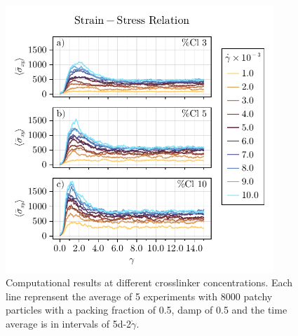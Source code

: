 \begin{figure}[ht!]
    \centering
    \includegraphics[width=0.9\textwidth]{figs/ComputaitonalResults/stress-strain.pdf}
    \caption{Computational results at different crosslinker concentrations. Each line reprensent the average of 5 experiments with \num{8000} patchy particles with a packing fraction of \num{0.5}, damp of \num{0.5} and the time average is in intervals of \num{5d-2}$\dot{\gamma}$.}\label{fig:stres-strainResults}
\end{figure}

